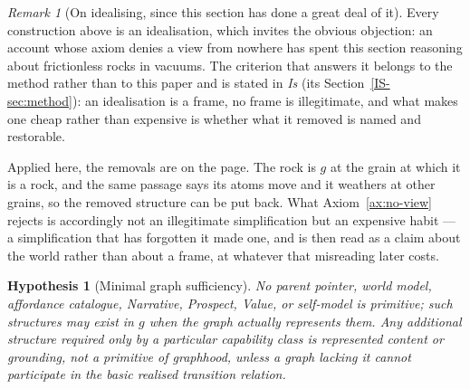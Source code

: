 \documentclass[11pt,a4paper]{article}
\newtheorem{hypothesis}[definition]{Hypothesis}
\theoremstyle{remark}\newtheorem{remark}[definition]{Remark}
\begin{document}
\begin{remark}[On idealising, since this section has done a great deal of it]\label{rem:idealising}
Every construction above is an idealisation, which invites the obvious objection: an account whose axiom
denies a view from nowhere has spent this section reasoning about frictionless rocks in vacuums. The
criterion that answers it belongs to the method rather than to this paper and is stated in \emph{Is}
(its Section~\ref{IS-sec:method}): an idealisation is a frame, no frame is illegitimate, and what makes one cheap rather than
expensive is whether what it removed is named and restorable.

Applied here, the removals are on the page. The rock is $g$ at the grain at which it is a rock, and the
same passage says its atoms move and it weathers at other grains, so the removed structure can be put
back. What Axiom~\ref{ax:no-view} rejects is accordingly not an illegitimate simplification but an expensive habit
--- a simplification that has forgotten it made one, and is then read as a claim about the world rather
than about a frame, at whatever that misreading later costs.
\end{remark}

\begin{hypothesis}[Minimal graph sufficiency]\label{hyp:minimal-graph}
No parent pointer, world model, affordance catalogue, Narrative, Prospect, Value, or self-model is
primitive; such structures may exist in $g$ when the graph actually represents them. Any additional
structure required only by a particular capability class is represented content or grounding, not a
primitive of graphhood, unless a graph lacking it cannot participate in the basic realised transition
relation.
\end{hypothesis}
\end{document}
